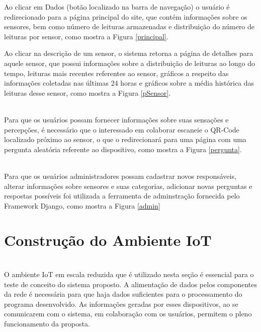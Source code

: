 
\null \quad Ao clicar em Dados (botão localizado na barra de navegação) o usuário é redirecionado para a página principal do site, que contém informações sobre os sensores, bem como número de leituras armazenadas e distribuição do número de leituras por sensor, como mostra a Figura \ref{principal}.


\null \quad Ao clicar na descrição de um sensor, o sistema retorna a página de detalhes para aquele sensor, que possui informações sobre a distribuição de leituras ao longo do tempo, leituras mais recentes referentes ao sensor, gráficos a respeito das informações coletadas nas últimas 24 horas e gráficos sobre a média histórica das leituras desse sensor, como mostra a Figura \ref{pSensor}.


\newpage
\\\null \quad Para que os usuários possam fornecer informações sobre suas sensações e percepções, é necessário que o interessado em colaborar escaneie o QR-Code localizado próximo ao sensor, o que o redirecionará para uma página com uma pergunta aleatória referente ao dispositivo, como mostra a Figura \ref{pergunta}.


\\\null \quad Para que os usuários administradores possam cadastrar novos responsáveis, alterar informações sobre sensores e suas categorias, adicionar novas perguntas e respostas possíveis foi utilizada a ferramenta de adminstração fornecida pelo Framework Django, como mostra a Figura \ref{admin}



\section{Construção do Ambiente IoT}
\\\null \quad O ambiente \acrshort{IoT} em escala reduzida que é utilizado nesta seção é essencial para o teste de conceito
do sistema proposto. A alimentação de dados pelos componentes da rede é necessária para que haja
dados suficientes para o processamento do programa desenvolvido. As informações geradas por esses dispositivos, ao se comunicarem com o sistema, em colaboração
com os usuários, permitem o pleno funcionamento da proposta.


